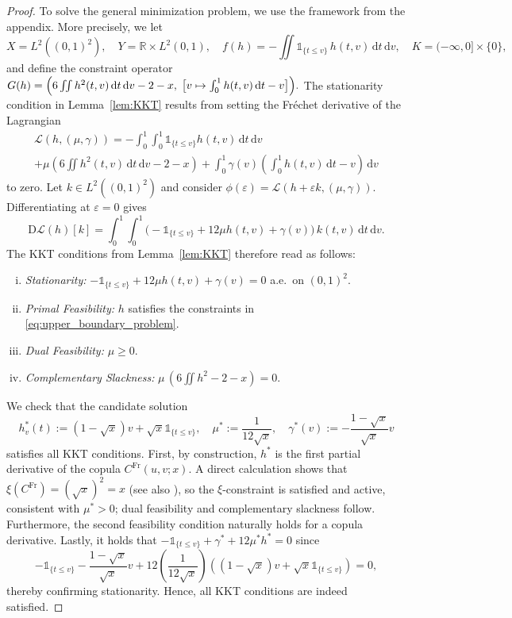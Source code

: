 \documentclass{article}
\newcommand{\1}{\mathds{1}}
\newcommand{\de}{\mathrm{\,d}}
\begin{document}
\begin{proof}
To solve the general minimization problem, we use the framework from the appendix.
More precisely, we let
\[
X=L^2((0,1)^2), \quad Y=\mathbb{R}\times L^2(0,1), \quad
f(h)= -\iint \1_{\{t\le v\}}\,h(t,v)\de t\de v,
\quad K = (-\infty,0]\times\{0\},
\]
and define the constraint operator
\(
  G(h)
  =\Bigl(
      6\iint h^2(t,v)\de t\de v - 2 - x,\;
      \bigl[v\mapsto \int_0^1 h(t,v)\de t - v\bigr]
    \Bigr).
\)
The stationarity condition in Lemma~\ref{lem:KKT} results from setting the Fréchet derivative of the Lagrangian
\begin{equation}\begin{multlined}\label{eq:lagrangian_upper_boundary}
\mathcal{L}(h, (\mu,\gamma)) = -\int_0^1\int_0^1 \1_{\{t\le v\}} h(t,v) \de t \de v \\
+ \mu \left( 6 \iint h^2(t,v) \de t \de v - 2 - x \right) 
+ \int_0^1 \gamma(v) \left( \int_0^1 h(t,v) \de t - v \right) \de v
\end{multlined}\end{equation}
to zero.
Let $k\in L^2((0,1)^2)$ and consider 
$\phi(\varepsilon)=\mathcal{L}(h+\varepsilon k,(\mu,\gamma))$.
Differentiating at $\varepsilon=0$ gives
\[
\mathrm{D}\mathcal{L}(h)[k] 
= \int_0^1\int_0^1 \big(-\1_{\{t\le v\}}+12\mu h(t,v)+\gamma(v)\big)\,k(t,v)\de t\de v.
\]
The KKT conditions from Lemma~\ref{lem:KKT} therefore read as follows:
\begin{enumerate}[(i)]
    \item \emph{Stationarity:} $-\1_{\{t\le v\}} + 12\mu h(t,v) + \gamma(v) = 0$ a.e.\ on $(0,1)^2$.
    \item \emph{Primal Feasibility:} $h$ satisfies the constraints in \eqref{eq:upper_boundary_problem}.
    \item \emph{Dual Feasibility:} $\mu\ge 0$.
    \item \emph{Complementary Slackness:} $\mu\,(6 \iint h^2 - 2 - x)=0$.
\end{enumerate}
We check that the candidate solution
\[
    h^*_v(t) := (1-\sqrt{x})v + \sqrt{x}\1_{\{t \le v\}},
    \quad\mu^* := \frac{1}{12\sqrt{x}},
    \quad\gamma^*(v) := -\frac{1-\sqrt{x}}{\sqrt{x}}v
\]
satisfies all KKT conditions.
First, by construction, \(h^*\) is the first partial derivative of the copula \(C^{\text{Fr}}(u,v;x)\).
A direct calculation shows that \(\xi(C^{\text{Fr}}) = (\sqrt{x})^2 = x\) (see also \cite[Example 4]{fuchs2024quantifying}), so the \(\xi\)-constraint is satisfied and active, consistent with \(\mu^* > 0\); dual feasibility and complementary slackness follow.
Furthermore, the second feasibility condition naturally holds for a copula derivative.
Lastly, it holds that $-\1_{\{t\le v\}} + \gamma^* + 12\mu^* h^* = 0$ since
\[
    -\1_{\{t \le v\}}-\frac{1-\sqrt{x}}{\sqrt{x}}v + 12\left(\frac{1}{12\sqrt{x}}\right)\left((1-\sqrt{x})v + \sqrt{x}\1_{\{t \le v\}}\right)
    = 0,
\]
thereby confirming stationarity.
Hence, all KKT conditions are indeed satisfied.


\end{proof}
\end{document}
